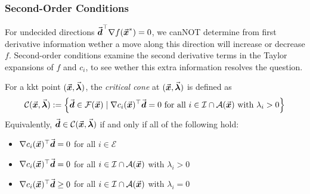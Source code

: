 
\subsubsection{Second-Order Conditions}




For undecided directions \(\vec{\boldsymbol{d}}^\top \nabla f(\vec{\boldsymbol{x}}^{\ast}) = 0\), we canNOT determine from first derivative information wether a move along this direction will increase or decrease \(f\).
Second-order conditions examine the second derivative terms in the Taylor expansions of \(f\) and \(c_i\), to see wether this extra information resolves the question.


\begin{definition}\label{def:critical_cone}
  For a \gls{kkt} point \( (\vec{\boldsymbol{x}},\vec{\boldsymbol{\lambda}}) \), the \emph{critical cone} at \((\vec{\boldsymbol{x}},\vec{\boldsymbol{\lambda}})\) is defined as
  \begin{equation}\label{eq:critical_cone}
    \mathcal{C}(\vect{x},\vect{\lambda}) := \left\{ \vect{d}\in\mathcal{F}(\vect{x}) \mid \nabla c_{i}(\vect{x})^{\top} \vect{d} = 0 \text{ for all } i\in\mathcal{I}\cap\mathcal{A}(\vect{x}) \text{ with } \lambda_{i}>0\right\} %
  \end{equation}
  Equivalently, \(\vec{\boldsymbol{d}} \in \mathcal{C}(\vec{\boldsymbol{x}},\vec{\boldsymbol{\lambda}})\) if and only if all of the following hold:
  \begin{itemize}
    \item \(\nabla c_{i}(\vec{\boldsymbol{x}})^{\top} \vec{\boldsymbol{d}} = 0\) for all \(i\in\mathcal{E}\)
    \item  \(\nabla c_{i}(\vec{\boldsymbol{x}})^{\top} \vec{\boldsymbol{d}} = 0\) for all \(i\in\mathcal{I}\cap\mathcal{A}(\vec{\boldsymbol{x}})\) with \(\lambda_{i}>0\)
    \item \(\nabla c_{i}(\vec{\boldsymbol{x}})^{\top} \vec{\boldsymbol{d}} \ge 0\) for all \(i\in\mathcal{I}\cap \mathcal{A}(\vec{\boldsymbol{x}})\) with \(\lambda_{i}=0\) \qedhere
  \end{itemize}
\end{definition}

